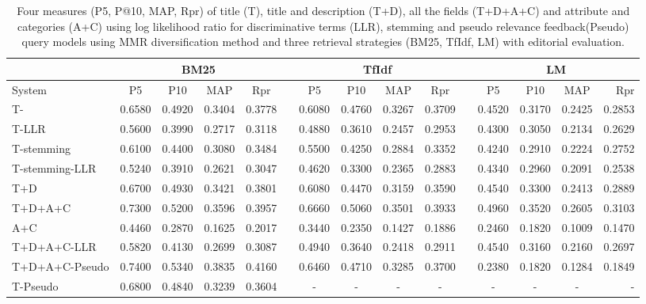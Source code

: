 \begin{table}[H]
\begin{center}
\scriptsize
\caption{
Four measures (P\@5, P@10, MAP, Rpr) of title (T), title and description (T+D), all the fields (T+D+A+C) and attribute and categories (A+C) using log likelihood ratio for discriminative terms (LLR), stemming and pseudo relevance feedback(Pseudo) query models using MMR diversification method and three retrieval strategies (BM25, TfIdf, LM) with editorial evaluation.}
\label{table:mmrEd}

\begin{tabular}{lcccccccccccccr}
\toprule
 & \multicolumn{4}{c}{BM25} &    & \multicolumn{4}{c}{TfIdf} &    & \multicolumn{4}{c}{LM} \\
\midrule
System & P\@5 & P\@10 & MAP & Rpr &   & P\@5 & P\@10 & MAP & Rpr &   & P\@5 & P\@10 & MAP & Rpr \\
\midrule

T- & 0.6580 & 0.4920 & 0.3404 & 0.3778 &   & 0.6080 & 0.4760 & 0.3267 & 0.3709 &   & 0.4520 & 0.3170 & 0.2425 & 0.2853 \\
T-LLR & 0.5600 & 0.3990 & 0.2717 & 0.3118 &   & 0.4880 & 0.3610 & 0.2457 & 0.2953 &   & 0.4300 & 0.3050 & 0.2134 & 0.2629 \\
T-stemming & 0.6100 & 0.4400 & 0.3080 & 0.3484 &   & 0.5500 & 0.4250 & 0.2884 & 0.3352 &   & 0.4240 & 0.2910 & 0.2224 & 0.2752 \\
T-stemming-LLR & 0.5240 & 0.3910 & 0.2621 & 0.3047 &   & 0.4620 & 0.3300 & 0.2365 & 0.2883 &   & 0.4340 & 0.2960 & 0.2091 & 0.2538 \\
T+D & 0.6700 & 0.4930 & 0.3421 & 0.3801 &   & 0.6080 & 0.4470 & 0.3159 & 0.3590 &   & 0.4540 & 0.3300 & 0.2413 & 0.2889 \\
T+D+A+C & 0.7300 & 0.5200 & 0.3596 & 0.3957 &   & 0.6660 & 0.5060 & 0.3501 & 0.3933 &   & 0.4960 & 0.3520 & 0.2605 & 0.3103 \\
A+C & 0.4460 & 0.2870 & 0.1625 & 0.2017 &   & 0.3440 & 0.2350 & 0.1427 & 0.1886 &   & 0.2460 & 0.1820 & 0.1009 & 0.1470 \\
T+D+A+C-LLR & 0.5820 & 0.4130 & 0.2699 & 0.3087 &   & 0.4940 & 0.3640 & 0.2418 & 0.2911 &   & 0.4540 & 0.3160 & 0.2160 & 0.2697 \\
T+D+A+C-Pseudo & 0.7400 & 0.5340 & 0.3835 & 0.4160 &   & 0.6460 & 0.4710 & 0.3285 & 0.3700 &   & 0.2380 & 0.1820 & 0.1284 & 0.1849 \\
T-Pseudo & 0.6800 & 0.4840 & 0.3239 & 0.3604 &   & - & - & - & - &   & - & - & - & -   \\
\bottomrule
\end{tabular}
\end{center}
\end{table}


